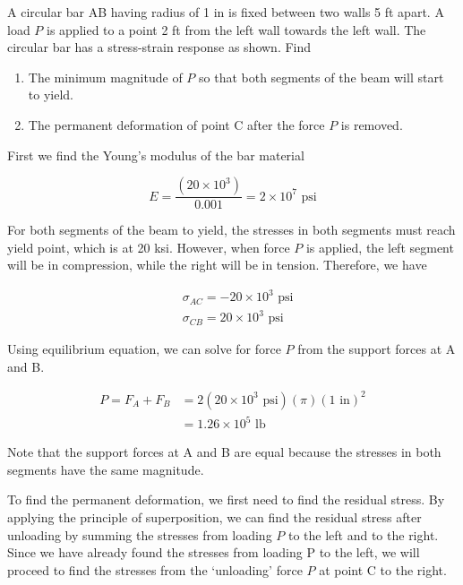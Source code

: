\documentclass[
fontsize=10pt,
a4paper,
twosides=false,
open=any,
svgnames,
]{kaobook} %
\begin{document}
\begin{example}

  A circular bar AB having radius of 1 in is fixed between two walls 5 ft apart. A load $P$ is applied to a point 2 ft from the left wall towards the left wall. The circular bar has a stress-strain response as shown. Find
  \begin{enumerate}
  \item The minimum magnitude of $P$ so that both segments of the beam will start to yield.
  \item The permanent deformation of point C after the force $P$ is removed.
  \end{enumerate}

  First we find the Young’s modulus of the bar material
  
  \[E = \frac{{(20 \times {{10}^3})}}{{0.001}} = 2 \times {10^7} \text{ psi}\]	
  
  For both segments of the beam to yield, the stresses in both segments must reach yield point, which is at 20 ksi. However, when force $P$ is applied, the left segment will be in compression, while the right will be in tension. Therefore, we have
  
  \begin{align*}
    &{\sigma _{AC}} =  - 20 \times {10^3} \text{ psi} \\
    &{\sigma _{CB}} = 20 \times {10^3} \text{ psi}
  \end{align*}	

  Using equilibrium equation, we can solve for force $P$ from the support forces at A and B.
  
  \begin{align*}
    P = {F_A} + {F_B} &= 2(20 \times {10^3} \text{ psi})(\pi ){(1 \text{ in})^2} \\ 
                      &= 1.26 \times {10^5} \text{ lb}
  \end{align*}	
  
  Note that the support forces at A and B are equal because the stresses in both segments have the same magnitude.
  
  To find the permanent deformation, we first need to find the residual stress. By applying the principle of superposition, we can find the residual stress after unloading by summing the stresses from loading $P$ to the left and to the right. Since we have already found the stresses from loading P to the left, we will proceed to find the stresses from the ‘unloading’ force $P$ at point C to the right.
  

\end{example}
\end{document}
